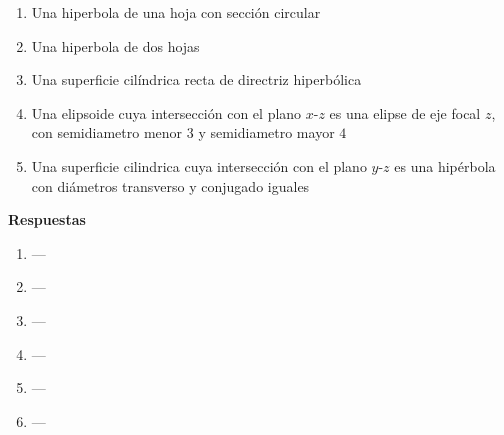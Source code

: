 \documentclass[a4paper]{article}
\newcommand{\exercise}{\item}
\begin{document}
\begin{enumerate}
\begin{multicols}{2}
\begin{enumerate} [label=(\alph*)]
		\item Una hiperbola de una hoja con sección circular
		\item Una hiperbola de dos hojas
		\item Una superficie cilíndrica recta de directriz hiperbólica
		\item Una elipsoide cuya intersección con el plano $x$-$z$ es una elipse de eje focal $z$, con semidiametro menor $3$ y semidiametro mayor $4$
		\item Una superficie cilindrica cuya intersección con el plano $y$-$z$ es una hipérbola con diámetros transverso y conjugado iguales 
	\end{enumerate}
	\end{multicols}
\end{enumerate}
\vspace{20pt} 
 \textbf{Respuestas}\begin{enumerate}\exercise---\exercise---\exercise---\exercise---\exercise---\exercise---\end{enumerate}
\end{document}
